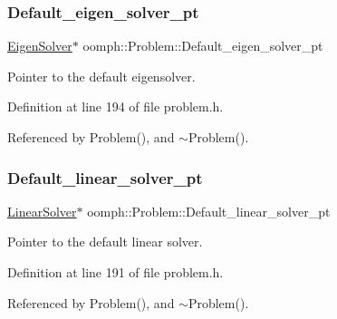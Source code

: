 \subsubsection{\texorpdfstring{Default\+\_\+eigen\+\_\+solver\+\_\+pt}{Default\_eigen\_solver\_pt}}
{\footnotesize\ttfamily \hyperlink{classoomph_1_1EigenSolver}{Eigen\+Solver}$\ast$ oomph\+::\+Problem\+::\+Default\+\_\+eigen\+\_\+solver\+\_\+pt\hspace{0.3cm}{\ttfamily [private]}}



Pointer to the default eigensolver. 



Definition at line 194 of file problem.\+h.



Referenced by Problem(), and $\sim$\+Problem().

\mbox{\label{classoomph_1_1Problem_ad01b385b2b4cd2e0b867754bea7b798a}} 
\subsubsection{\texorpdfstring{Default\+\_\+linear\+\_\+solver\+\_\+pt}{Default\_linear\_solver\_pt}}
{\footnotesize\ttfamily \hyperlink{classoomph_1_1LinearSolver}{Linear\+Solver}$\ast$ oomph\+::\+Problem\+::\+Default\+\_\+linear\+\_\+solver\+\_\+pt\hspace{0.3cm}{\ttfamily [private]}}



Pointer to the default linear solver. 



Definition at line 191 of file problem.\+h.



Referenced by Problem(), and $\sim$\+Problem().

\mbox{\label{classoomph_1_1Problem_a83df3b5fcc3ebbae951021c8e7f03ef7}} 
